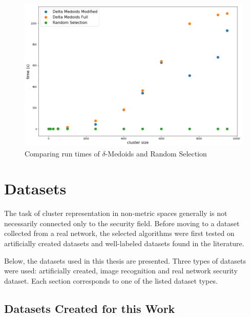 \documentclass[thesis=B,english]{FITthesis}[2012/10/20]
\begin{document}
\begin{figure}
  \includegraphics[width=\linewidth]{img/complexity.png}
  \caption{Comparing run times of $\delta$-Medoids and Random Selection}
  \label{img:complexity}
\end{figure}


\chapter{Datasets}\label{ch:datasets}

The task of cluster representation in non-metric spaces generally is not necessarily connected only to the security field.
Before moving to a dataset collected from a real network, the selected algorithms were first tested on artificially created datasets and well-labeled datasets found in the literature.

Below, the datasets used in this thesis are presented.
Three types of datasets were used: artificially created, image recognition and real network security dataset.
Each section corresponds to one of the listed dataset types.

\section{Datasets Created for this Work}
\end{document}
